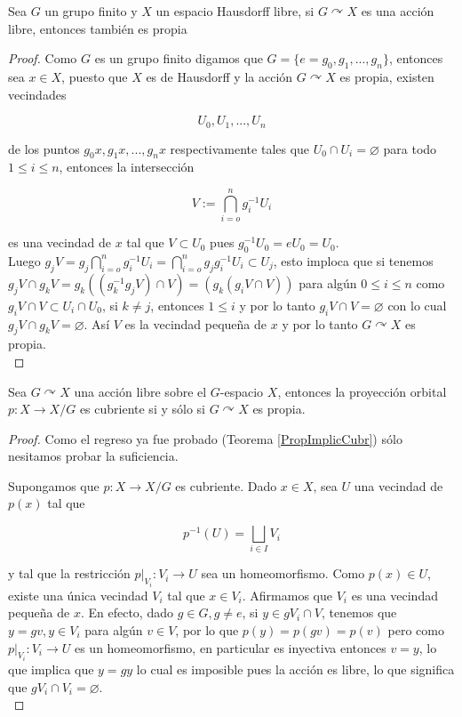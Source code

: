 \begin{theorem}
Sea $G$ un grupo finito y $X$ un espacio Hausdorff libre, si $G \curvearrowright X$ es una acci\'on libre, entonces tambi\'en es propia 
\end{theorem}

\begin{proof}
Como $G$ es un grupo finito digamos que $G=\lbrace e= g_0,g_1,...,g_n\rbrace$, entonces sea $x \in X$, puesto que $X$ es de Hausdorff y la acci\'on $G \curvearrowright X$ es propia, existen vecindades

$$U_0,U_1,...,U_n$$ 

de los puntos $g_0x,g_1x,...,g_nx$ respectivamente tales que $U_0 \cap U_i =\varnothing$ para todo $1 \leq i \leq n$, entonces la intersecci\'on 

$$ V:= \bigcap_{i=o}^n g^{-1}_iU_i$$

es una vecindad de $x$ tal que $V \subset U_0$ pues $g^{-1}_0U_0=eU_0=U_0$.\\

Luego $g_jV= g_j \bigcap_{i=o}^n g^{-1}_iU_i= \bigcap_{i=o}^n g_jg^{-1}_iU_i \subset U_j$, esto imploca que si tenemos $g_jV \cap g_k V= g_k((g_k^{-1}g_jV)\cap V)=(g_k(g_iV \cap  V))$ para alg\'un $0 \leq i \leq n$ como $g_iV \cap V \subset U_i \cap U_0$, si $k \neq j$, entonces $ 1 \leq i$ y por lo tanto $g_iV \cap V = \varnothing$ con lo cual $g_jV \cap g_kV= \varnothing$. As\'i $V$ es la vecindad peque\~na de $x$ y por lo tanto $G \curvearrowright X$ es propia.\\
\end{proof}

\begin{theorem}
Sea $G \curvearrowright X$ una acci\'on libre sobre el $G$-espacio $X$, entonces la proyecci\'on orbital $p:X \rightarrow X/G$ es cubriente si y s\'olo si $G \curvearrowright X$ es propia.
\end{theorem}

\begin{proof}
Como el regreso ya fue probado (Teorema \ref{PropImplicCubr}) s\'olo nesitamos probar la suficiencia. 

Supongamos que $p:X \rightarrow X/G$ es cubriente. Dado $x \in X$, sea $U$ una vecindad de $p(x)$ tal que 

$$ p^{-1}(U)= \bigsqcup_{i \in I}V_i$$

y tal que la restricci\'on $p \vert_{V_i}:V_i \rightarrow U$ sea un homeomorfismo. Como $p(x)\in U$, existe una \'unica vecindad $V_i$ tal que $x \in V_i$. Afirmamos que $V_i$ es una vecindad peque\~na de $x$. En efecto, dado $g \in G, g \neq e$, si $y \in gV_i \cap V$, tenemos que $y=gv,y \in V_i$ para alg\'un $v \in V$, por lo que $p(y)=p(gv)=p(v)$ pero como $p \vert_{V_i}:V_i \rightarrow U$ es un homeomorfismo, en particular es inyectiva entonces $v=y$, lo que implica que $y=gy$ lo cual es imposible pues la acci\'on es libre, lo que significa que $gV_i \cap V_i=\varnothing$.\\  
\end{proof}

